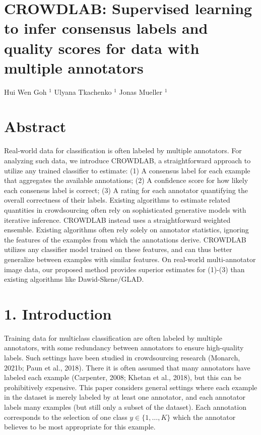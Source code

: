\documentclass[
]{article}
\author{}
\date{}
\begin{document}
\section{CROWDLAB: Supervised learning to infer consensus labels and
quality scores for data with multiple
annotators}\label{crowdlab-supervised-learning-to-infer-consensus-labels-and-quality-scores-for-data-with-multiple-annotators}

Hui Wen Goh \(^{1}\) Ulyana Tkachenko \(^{1}\) Jonas Mueller \(^{1}\)

\section{Abstract}\label{abstract}

Real-world data for classification is often labeled by multiple
annotators. For analyzing such data, we introduce CROWDLAB, a
straightforward approach to utilize any trained classifier to estimate:
(1) A consensus label for each example that aggregates the available
annotations; (2) A confidence score for how likely each consensus label
is correct; (3) A rating for each annotator quantifying the overall
correctness of their labels. Existing algorithms to estimate related
quantities in crowdsourcing often rely on sophisticated generative
models with iterative inference. CROWDLAB instead uses a straightforward
weighted ensemble. Existing algorithms often rely solely on annotator
statistics, ignoring the features of the examples from which the
annotations derive. CROWDLAB utilizes any classifier model trained on
these features, and can thus better generalize between examples with
similar features. On real-world multi-annotator image data, our proposed
method provides superior estimates for (1)-(3) than existing algorithms
like Dawid-Skene/GLAD.

\section{1. Introduction}\label{introduction}

Training data for multiclass classification are often labeled by
multiple annotators, with some redundancy between annotators to ensure
high-quality labels. Such settings have been studied in crowdsourcing
research (Monarch, 2021b; Paun et al., 2018). There it is often assumed
that many annotators have labeled each example (Carpenter, 2008; Khetan
et al., 2018), but this can be prohibitively expensive. This paper
considers general settings where each example in the dataset is merely
labeled by at least one annotator, and each annotator labels many
examples (but still only a subset of the dataset). Each annotation
corresponds to the selection of one class \(y \in \{1, \ldots, K\}\)
which the annotator believes to be most appropriate for this example.
\end{document}

